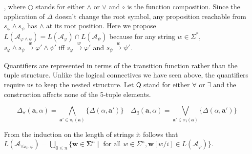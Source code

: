 \begin{prooftree}
\end{prooftree}

, where \( \bigcirc \) stands for either \( \wedge \) or \( \vee \) and \( \circ
\) is the function composition. Since the application of \( \Delta \) doesn't
change the root symbol, any proposition reachable from \(s_\varphi \wedge s_\psi
\) has \( \wedge \) at its root position. Here we propose \(
L(\mathcal{A}_{\varphi \wedge \psi}) = L(\mathcal{A}_{\varphi}) \cap
L(\mathcal{A}_{\psi}) \) because for any string \( w \in \Sigma^* \), \(
s_\varphi \wedge s_\psi \xrightarrow[]w \varphi' \wedge \psi' \) iff \(
s_\varphi \xrightarrow[]w \varphi' \) and \( s_\psi \xrightarrow[]w \psi' \).

Quantifiers are represented in terms of the transition function rather than the
tuple structure. Unlike the logical connectives we have seen above, the
quantifiers require us to keep the nested structure. Let \( \mathsf{Q} \) stand
for either \( \forall \) or \( \exists \) and the construction affects none of
the 5-tuple elements.

\begin{prooftree}
\end{prooftree}

\[
\Delta_{\forall}(\mathbf{a}, \alpha) =
\bigwedge\limits_{\mathbf{a}' \in \pi_i(\mathbf{a})} 
\{ \Delta(\alpha, \mathbf{a}') \}
\quad
\Delta_{\exists}(\mathbf{a}, \alpha) = 
\bigvee  \limits_{\mathbf{a}' \in \pi_i(\mathbf{a})} 
\{ \Delta(\alpha, \mathbf{a}') \}
\]

From the induction on the length of strings it follows that
\(L(\mathcal{A}_{\forall x_i .\ \varphi}) = \bigcup\limits_{0 \leq n}\{
\mathbf{w} \in \boldsymbol{\Sigma}^n \mid \text{ for all } w \in \Sigma^n ,
\mathbf{w}[w/i]\in L(\mathcal{A}_{\varphi}) \} \).

